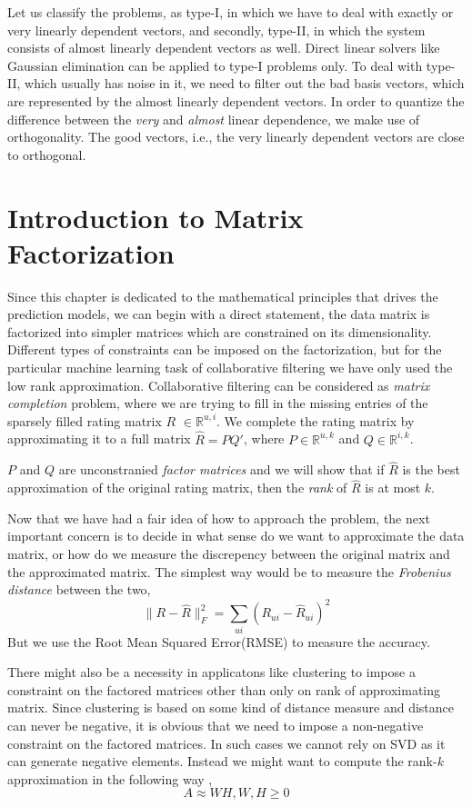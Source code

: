 Let us classify the problems, as type-I, in which we have to deal with exactly
or very linearly dependent vectors, and secondly, type-II, in which the system
consists of almost linearly dependent vectors as well. Direct linear solvers
like Gaussian elimination can be applied to type-I problems only. To deal with
type-II, which usually has noise in it, we need to filter out the bad basis
vectors, which are represented by the almost linearly dependent vectors. In
order to quantize the difference between the \emph{very} and \emph{almost}
linear dependence, we make use of orthogonality. The good vectors, i.e., the
very linearly dependent vectors are close to orthogonal. 


  
\section{Introduction to Matrix Factorization}
Since this chapter is dedicated to the mathematical principles that drives the
prediction models, we can begin with a direct statement, the data matrix is
factorized into simpler matrices which are constrained on its dimensionality.
Different types of constraints can be imposed on the factorization, but for the
particular machine learning task of collaborative filtering we have only used
the low rank approximation. Collaborative filtering can be considered as
\emph{matrix completion} problem, where we are trying to fill in the missing
entries of the sparsely filled rating matrix $R$ $\in\mathbb{R}^{u,i}$. We
complete the rating matrix by approximating it to a full matrix $\hat{R}=PQ'$,
where $P \in\mathbb{R}^{u,k}$ and $Q \in\mathbb{R}^{i,k}$. 

$P$ and $Q$ are unconstranied \emph{factor matrices} and we will show that if
$\hat{R}$ is the best approximation of the original rating matrix, then the
\emph{rank} of $\hat{R}$ is at most $k$. 

Now that we have had a fair idea of how to approach the problem, the next
important concern is to decide in what sense do we want to approximate the data
matrix, or how do we measure the discrepency between the original matrix and the
approximated matrix. The simplest way would be to measure the \emph{Frobenius
distance} between the two,
\[
 \|{R-\hat{R}}\|_{F}^2 = \sum_{ui}^{}(R_{ui}-\hat{R}_{ui})^2
\]
But we use the Root Mean Squared Error(RMSE) to measure the accuracy. 

There might also be a necessity in applicatons like clustering to impose a
constraint on the factored matrices other than only on rank of approximating
matrix. Since clustering is based on some kind of distance measure and distance
can never be negative, it is obvious that we need to impose a non-negative
constraint on the factored matrices. In such cases we cannot rely on SVD as it
can generate negative elements. Instead we might want to compute the rank-$k$
approximation in the following way \cite{eld-mm:07}, \\
\[
  A\approx WH,		W,H\geq0
\] \\

